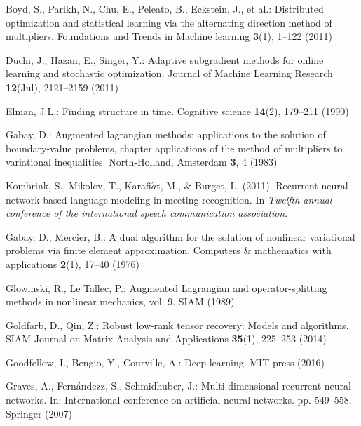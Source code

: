 \documentclass[twoside]{article}
\begin{document}
\begin{multicols}{2}
\begin{thebibliography}{99}
Boyd, S., Parikh, N., Chu, E., Peleato, B., Eckstein, J., et al.: Distributed optimization and statistical learning via the alternating direction method of multipliers. Foundations and Trends{\textregistered} in Machine learning \textbf{3}(1), 1--122 (2011)

Duchi, J., Hazan, E., Singer, Y.: Adaptive subgradient methods for online learning and stochastic optimization. Journal of Machine Learning Research \textbf{12}(Jul), 2121--2159 (2011)

Elman, J.L.: Finding structure in time. Cognitive science \textbf{14}(2), 179--211 (1990)

Gabay, D.: Augmented lagrangian methods: applications to the solution of boundary-value problems, chapter applications of the method of multipliers to
variational inequalities. North-Holland, Amsterdam \textbf{3}, 4 (1983)

Kombrink, S., Mikolov, T., Karafi${\acute a}$t, M., \& Burget, L. (2011). 
Recurrent neural network based language modeling in meeting recognition. In {\it Twelfth annual conference of the international speech communication association}.

Gabay, D., Mercier, B.: A dual algorithm for the solution of nonlinear variational problems via finite element approximation. Computers \& mathematics with applications \textbf{2}(1), 17--40 (1976)


Glowinski, R., Le Tallec, P.: Augmented Lagrangian and operator-splitting methods in nonlinear mechanics, vol. 9. SIAM (1989)

Goldfarb, D., Qin, Z.: Robust low-rank tensor recovery: Models and algorithms. SIAM Journal on Matrix Analysis and Applications \textbf{35}(1), 225--253 (2014)

Goodfellow, I., Bengio, Y., Courville, A.: Deep learning. MIT press (2016)

Graves, A., Fern{\'a}ndezz, S., Schmidhuber, J.: Multi-dimensional recurrent neural networks. In: International conference on artificial neural networks. pp. 549--558. Springer (2007)


\end{thebibliography}
\end{multicols}
\end{document}
